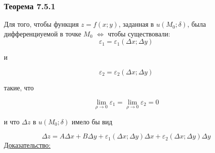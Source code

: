 \documentclass[12pt]{article}
\begin{document}
    \subsubsection*{Теорема 7.5.1}\label{th:7.5.1}
    Для того, чтобы функция $z = f(x;y)$, заданная в $u(M_0; \delta)$, была дифференциуемой в точке $M_0$ $\Leftrightarrow$ чтобы существовали: 
    \[\varepsilon_1 = \varepsilon_1(\Delta x; \Delta y)\]
    \begin{center}
        и
    \end{center}
    \[\varepsilon_2 = \varepsilon_2 (\Delta x; \Delta y)\] 
    \begin{center}
        такие, что
    \end{center}
    \[\lim_{\rho \to 0}\varepsilon_1 = \lim_{\rho \to 0}\varepsilon_2 = 0\]
    \begin{center}
        и что $\Delta z$ в $u(M_0; \delta)$ имело бы вид
    \end{center}
    \[ \Delta z = A \Delta x + B \Delta y + \varepsilon_1 (\Delta x; \Delta y)\Delta x + \varepsilon_2 (\Delta x; \Delta y)\Delta y \]
    \noindent\underline{Доказательство:}
\end{document}
